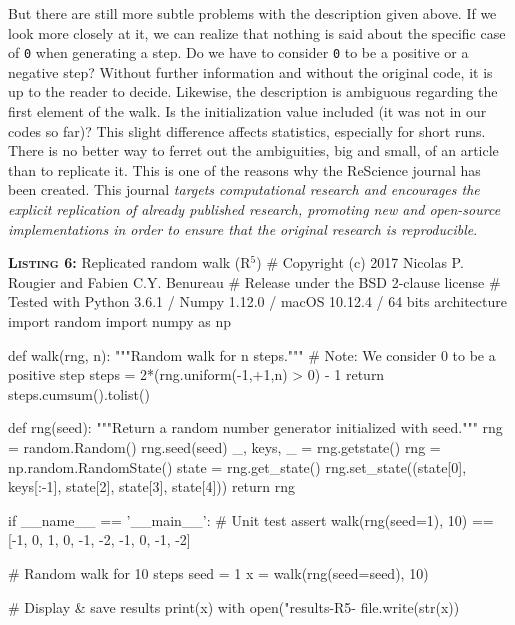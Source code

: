 \documentclass[a4paper,11pt]{article}
\begin{document}
But there are still more subtle problems with the description given above.
If we look more closely at it, we can realize
that nothing is said about the specific case of {\tt 0} when generating a step.
Do we have to consider {\tt 0} to be a positive or a negative step? Without
further information and without the original code, it is up to the reader to
decide. Likewise, the description is ambiguous regarding the first element of the walk. Is the initialization value included (it was not in our codes so far)? This slight difference affects statistics, especially for short runs.\\

There is no better way to ferret out the ambiguities, big and small, of an
article than to replicate it. This is one of the reasons why the ReScience
journal \citep{Rougier:2017} has been created. This journal {\em targets
  computational research and encourages the explicit replication of already
  published research, promoting new and open-source implementations in order to
  ensure that the original research is reproducible}.\\

\noindent \begin{minipage}[c]{\linewidth}
\begin{code}{\textbf{\textsc{Listing 6:}} Replicated random walk (R$^5$)}
# Copyright (c) 2017 Nicolas P. Rougier and Fabien C.Y. Benureau
# Release under the BSD 2-clause license
# Tested with Python 3.6.1 / Numpy 1.12.0 / macOS 10.12.4 / 64 bits architecture
import random
import numpy as np

def walk(rng, n):
    """Random walk for n steps."""
    # Note: We consider 0 to be a positive step
    steps = 2*(rng.uniform(-1,+1,n) > 0) - 1
    return steps.cumsum().tolist()

def rng(seed):
    """Return a random number generator initialized with seed."""
    rng = random.Random()
    rng.seed(seed)
    _, keys, _ = rng.getstate()
    rng = np.random.RandomState()
    state = rng.get_state()
    rng.set_state((state[0], keys[:-1], state[2], state[3], state[4]))
    return rng

if __name__ == '__main__':
    # Unit test
    assert walk(rng(seed=1), 10) == [-1, 0, 1, 0, -1, -2, -1, 0, -1, -2]

    # Random walk for 10 steps
    seed = 1
    x = walk(rng(seed=seed), 10)

    # Display & save results
    print(x)
    with open("results-R5-%
        file.write(str(x))
\end{code}
\end{minipage}
\end{document}
